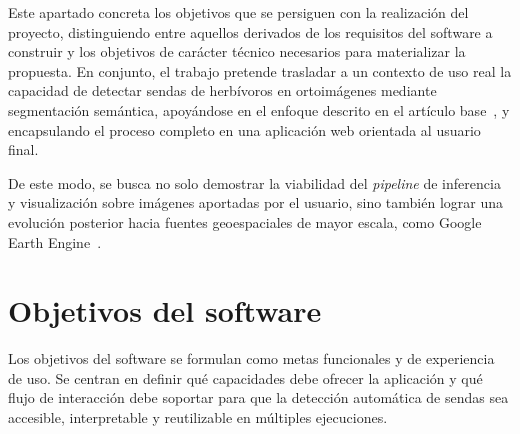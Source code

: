 
Este apartado concreta los objetivos que se persiguen con la realización del proyecto, distinguiendo entre aquellos derivados de los requisitos del software a construir y los objetivos de carácter técnico necesarios para materializar la propuesta. En conjunto, el trabajo pretende trasladar a un contexto de uso real la capacidad de detectar sendas de herbívoros en ortoimágenes mediante segmentación semántica, apoyándose en el enfoque descrito en el artículo base~\cite{diezpastora2025trails}, y encapsulando el proceso completo en una aplicación web orientada al usuario final. 

De este modo, se busca no solo demostrar la viabilidad del \textit{pipeline} de inferencia y visualización sobre imágenes aportadas por el usuario, sino también lograr una evolución posterior hacia fuentes geoespaciales de mayor escala, como Google Earth Engine~\cite{googleearthengine_web}.

\section{Objetivos del software}

Los objetivos del software se formulan como metas funcionales y de experiencia de uso. Se centran en definir qué capacidades debe ofrecer la aplicación y qué flujo de interacción debe soportar para que la detección automática de sendas sea accesible, interpretable y reutilizable en múltiples ejecuciones.

